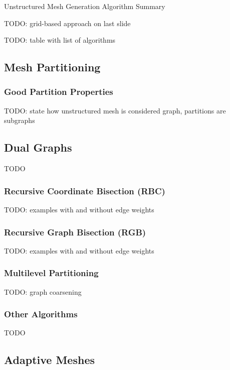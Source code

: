 \documentclass{article}
\begin{document}
Unstructured Mesh Generation Algorithm Summary

TODO: grid-based approach on last slide

TODO: table with list of algorithms

\subsection{Mesh Partitioning}

\subsubsection{Good Partition Properties}

TODO: state how unstructured mesh is considered graph, partitions are subgraphs

\subsection{Dual Graphs}

TODO

\subsubsection{Recursive Coordinate Bisection (RBC)}

TODO: examples with and without edge weights

\subsubsection{Recursive Graph Bisection (RGB)}

TODO: examples with and without edge weights

\subsubsection{Multilevel Partitioning}

TODO: graph coarsening

\subsubsection{Other Algorithms}

TODO

\subsection{Adaptive Meshes}
\end{document}
